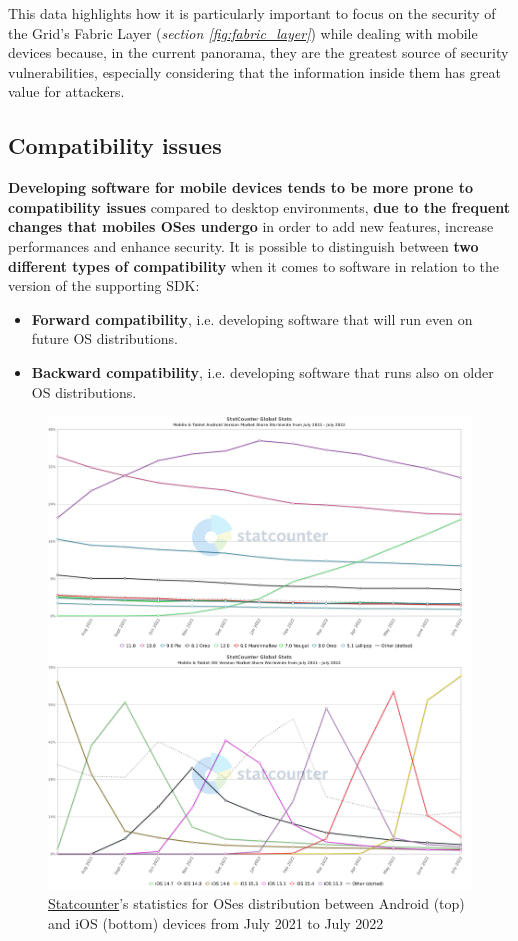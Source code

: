 This data highlights how it is particularly important to focus on the security of the Grid's Fabric Layer (\textit{section \ref{fig:fabric_layer}}) while dealing with mobile devices because, in the current panorama, they are the greatest source of security vulnerabilities, especially considering that the information inside them has great value for attackers.

\subsection{Compatibility issues}
\textbf{Developing software for mobile devices tends to be more prone to compatibility issues} compared to desktop environments, \textbf{due to the frequent changes that mobiles OSes undergo} in order to add new features, increase performances and enhance security. It is possible to distinguish between \textbf{two different types of compatibility} when it comes to software in relation to the version of the supporting SDK:

\begin{itemize}
    \item \textbf{Forward compatibility}, i.e. developing software that will run even on future OS distributions.
    \item \textbf{Backward compatibility}, i.e. developing software that runs also on older OS distributions.
\end{itemize}

\begin{figure}[!ht]
    \centering
    \includegraphics[scale=0.4]{document/chapters/chapter_3/images/stat_counter_ios_android.png}
    \caption{\href{https://gs.statcounter.com/}{Statcounter}'s statistics for OSes distribution between Android (top) and iOS (bottom) devices from July 2021 to July 2022}
    \label{fig:stat_counter_ios_android}
\end{figure}

